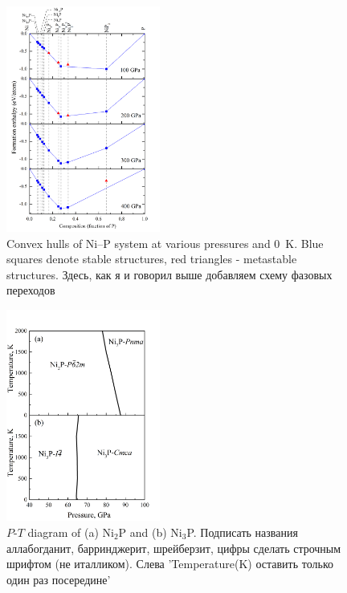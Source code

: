 \documentclass[twoside,twocolumn,9pt]{article}
\begin{document}
\begin{figure}[h]
 \centering
 \includegraphics[width=0.45\textwidth]{convex_hull-2.png} %
 \caption{Convex hulls of Ni--P system at various pressures and 0~K. Blue squares denote stable structures, red triangles - metastable structures. Здесь, как я и говорил выше добавляем схему фазовых переходов}
 \label{fgr:convex_hull}
\end{figure}


\begin{figure}[h]
\centering
  \includegraphics[width=0.45\textwidth]{PT-Ni2P-Ni3P.jpg}
  \caption{$P$-$T$ diagram of (a) Ni$_2$P and (b) Ni$_3$P. Подписать названия аллабогданит, барринджерит, шрейберзит, цифры сделать строчным шрифтом (не италликом). Слева 'Temperature(K) оставить только один раз посередине'}
  \label{fgr:PT-Ni2P-Ni3P}
\end{figure}

\end{document}
